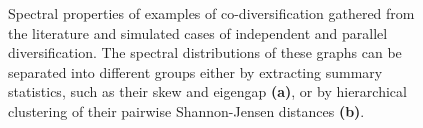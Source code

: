 \begin{figure}
    \centering
    \caption{Spectral properties of examples of co-diversification gathered from the literature and simulated cases of independent and parallel diversification. The spectral distributions of these graphs can be separated into different groups either by extracting summary statistics, such as their skew and eigengap \textbf{(a)}, or by hierarchical clustering of their pairwise Shannon-Jensen distances \textbf{(b)}.}
    \label{fig:FP_codivlit}
\end{figure}